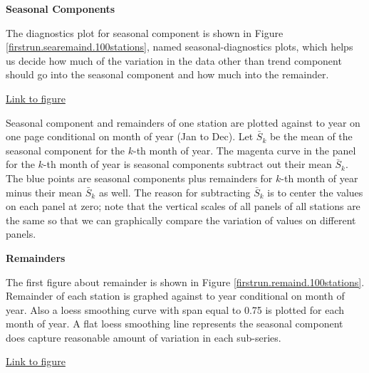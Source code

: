 \textbf{Seasonal Components}

The diagnostics plot for seasonal component is shown in Figure 
\href{../plots/100stations/first_run/sea+remaind.month.100stations.tmax.pdf}
{\ref*{firstrun.searemaind.100stations}}, named seasonal-diagnostics plots, which
helps us decide how much of the variation in the data other than trend component
should go into the seasonal component and how much into the remainder.

\begin{framed}
\begin{center}
  \href{../plots/100stations/first_run/sea+remaind.month.100stations.tmax.pdf}
  {Link to figure}
  \label{firstrun.searemaind.100stations}
\end{center}
\end{framed}

Seasonal component and remainders of
one station are plotted against to year on one page conditional on month of year
(Jan to Dec). Let $\bar S_k$ be the mean of the seasonal component for the $k$-th 
month of year. The magenta curve in the panel for the $k$-th month of year is 
seasonal components subtract out their mean $\bar S_k$. The blue points are seasonal
components plus remainders for $k$-th month of year minus their mean $\bar S_k$ 
as well. The reason for subtracting $\bar S_k$ is to center the values on each 
panel at zero; note that the vertical scales of all panels of all stations are 
the same so that we can graphically compare the variation of values on different 
panels.

\textbf{Remainders}

The first figure about remainder is shown in Figure 
\href{../plots/100stations/first_run/remainder.month.100stations.tmax.pdf}
{\ref*{firstrun.remaind.100stations}}. Remainder of each station is graphed against
to year conditional on month of year. Also a loess smoothing curve with span equal
to 0.75 is plotted for each month of year. A flat loess smoothing line represents
the seasonal component does capture reasonable amount of variation in each 
sub-series.

\begin{framed}
\begin{center}
  \href{../plots/100stations/first_run/remainder.month.100stations.tmax.pdf}
  {Link to figure}
  \label{firstrun.remaind.100stations}
\end{center}
\end{framed}

